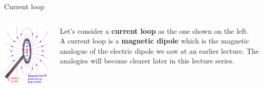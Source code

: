 \begin{frame}{Current loop}

\begin{columns}
  \begin{column}{0.40\textwidth}
    \includegraphics[width=0.99\textwidth]{./images/schematics/current_loop.png}\\
  \end{column}
  \begin{column}{0.60\textwidth}
        Let's consider a {\bf current loop} as the one shown on the left.\\
        \vspace{0.3cm}
        {\small
        A current loop is a {\bf magnetic dipole} which is the magnetic analogue of the
        electric dipole we saw at an earlier lecture. The analogies
        will become clearer later in this lecture series.\\
        }
  \end{column}
\end{columns}

\end{frame}

